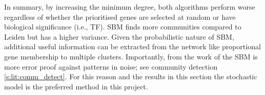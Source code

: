 In summary, by increasing the minimum degree, both algorithms perform worse regardless of whether the prioritised genes are selected at random or have biological significance (i.e., TF). SBM finds more communities compared to Leiden but has a higher variance. Given the probabilistic nature of SBM, additional useful information can be extracted from the network like proportional gene membership to multiple clusters. Importantly, from the work of \cite{Peixoto2023-mw} the SBM is more error proof against patterns in noise; see community detection \cref{s:lit:comm_detect}. For this reason and the results in this section the stochastic model is the preferred method in this project.

